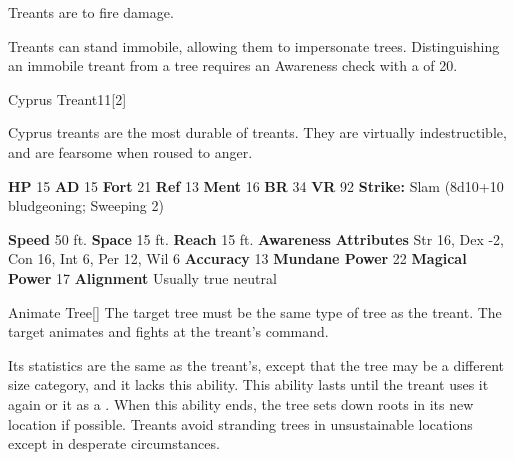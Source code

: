         Treants are  to fire damage.
      
        Treants can stand immobile, allowing them to impersonate trees.
        Distinguishing an immobile treant from a tree requires an Awareness check with a  of 20.
  

  \begin{monsubsection}{Cyprus Treant}{11}[2]
    \vspace{-1em}\vspace{-1em}
    \vspace{0em}

    
          Cyprus treants are the most durable of treants.
          They are virtually indestructible, and are fearsome when roused to anger.
        

    \begin{spellcontent}
      \begin{spelltargetinginfo}
        \pari \textbf{HP} 15 \monsep
          \textbf{AD} 15 \monsep
          \textbf{Fort} 21 \monsep
          \textbf{Ref} 13 \monsep
          \textbf{Ment} 16
        \pari \textbf{BR} 34 \monsep
        \textbf{VR} 92
        \pari \textbf{Strike:}
            Slam  (8d10+10 bludgeoning; Sweeping 2)
      \end{spelltargetinginfo}
    \end{spellcontent}
    \begin{monsterfooter}
      \pari \textbf{Speed} 50 ft. \monsep
        \textbf{Space} 15 ft. \monsep
        \textbf{Reach} 15 ft.
      \pari \textbf{Awareness} 
      \pari \textbf{Attributes}
        Str 16, Dex -2,
        Con 16, Int 6,
        Per 12, Wil 6
      \pari \textbf{Accuracy} 13 \monsep
        \textbf{Mundane Power} 22 \monsep
      \textbf{Magical Power} 17
      \pari \textbf{Alignment} Usually true neutral
    \end{monsterfooter}
  \end{monsubsection}
  \begin{freeability}{Animate Tree}[]
      The target tree must be the same type of tree as the treant.
        The target animates and fights at the treant's command.

        Its statistics are the same as the treant's, except that the tree may be a different size category, and it lacks this ability.
        This ability lasts until the treant uses it again or  it as a .
        When this ability ends, the tree sets down roots in its new location if possible.
        Treants avoid stranding trees in unsustainable locations except in desperate circumstances.
    \end{freeability}
  
